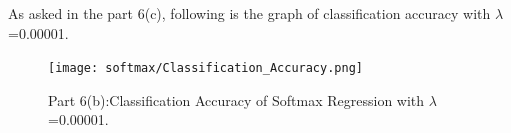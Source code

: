 \documentclass{article} %
\begin{document}
As asked in the part 6(c), following is the graph of classification accuracy with $\lambda$=0.00001.

\begin{figure}[h]
\begin{center}
\texttt{[image: softmax/Classification\_Accuracy.png]}
\end{center}
\caption{Part 6(b):Classification Accuracy of Softmax Regression with $\lambda$=0.00001.}
\end{figure}
\end{document}

